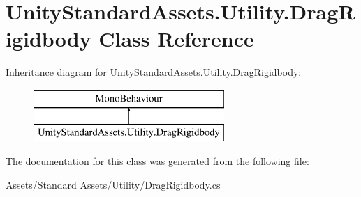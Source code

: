 \hypertarget{class_unity_standard_assets_1_1_utility_1_1_drag_rigidbody}{}\section{Unity\+Standard\+Assets.\+Utility.\+Drag\+Rigidbody Class Reference}
\label{class_unity_standard_assets_1_1_utility_1_1_drag_rigidbody}
Inheritance diagram for Unity\+Standard\+Assets.\+Utility.\+Drag\+Rigidbody\+:\begin{figure}[H]
\begin{center}
\leavevmode
\includegraphics[height=2.000000cm]{class_unity_standard_assets_1_1_utility_1_1_drag_rigidbody}
\end{center}
\end{figure}


The documentation for this class was generated from the following file\+:\begin{DoxyCompactItemize}
\item 
Assets/\+Standard Assets/\+Utility/Drag\+Rigidbody.\+cs\end{DoxyCompactItemize}
